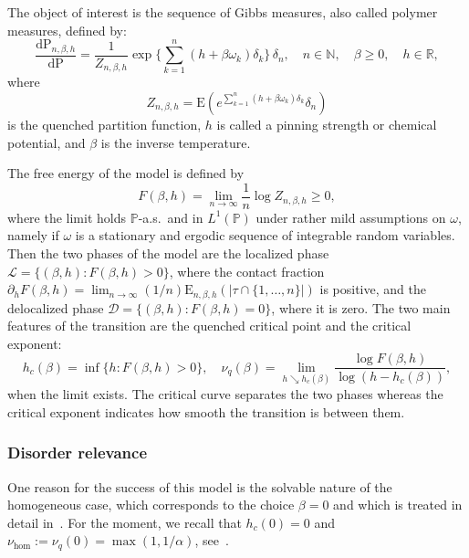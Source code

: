 \documentclass[11pt]{article}
\theoremstyle{definition}
\numberwithin{equation}{section}
\numberwithin{figure}{section}
\numberwithin{table}{section}
\newcommand{\bbN}{{\ensuremath{\mathbb N}}}
\newcommand{\bbP}{{\ensuremath{\mathbb P}}}
\newcommand{\bbR}{{\ensuremath{\mathbb R}}}
\newcommand{\cD}{{\ensuremath{\mathcal D}}}
\newcommand{\cL}{{\ensuremath{\mathcal L}}}
\newcommand{\ga}{\alpha}
\newcommand{\gb}{\beta}
\newcommand{\gd}{\delta}
\newcommand{\go}{\omega}
\newcommand{\dd}{\mathrm{d}}
\newcommand\bP{\ensuremath{\mathrm{P}}}
\newcommand\bE{\ensuremath{\mathrm{E}}}
\begin{document}
The object of interest is the sequence of Gibbs measures, also called polymer measures, defined by:
\begin{equation}\label{eq:defquemeas}
\frac{\dd \bP_{n,\gb,h}}{\dd \bP} = \frac{1}{Z_{n,\gb,h}} \exp \bigg\{\sum_{k=1}^n (h + \gb \go_k)\gd_k \bigg\} \,\gd_n, \quad n \in \bbN, \quad \gb \geq 0, \quad h \in \bbR,
\end{equation}
where
\begin{equation}\label{eq:defquepf}
Z_{n,\gb,h} = \bE \left(e^{\sum_{k=1}^n (h + \gb \go_k) \gd_k} \gd_n \right)
\end{equation}
is the quenched partition function, $h$ is called a pinning strength or chemical potential, and $\gb$ is the inverse temperature.

The free energy of the model is defined by
\begin{equation}
F(\gb,h) = \lim_{n \to \infty} \frac{1}{n} \log Z_{n,\gb,h} \geq 0,
\end{equation}
where the limit holds $\bbP$-a.s.~and in $L^1(\bbP)$ under rather mild assumptions on $\go$, namely if $\go$ is a stationary and ergodic sequence of integrable random variables. Then the two phases of the model are the localized phase $\cL = \{(\gb, h): F(\gb, h)>0\}$, where the contact fraction $\partial_h F(\gb,h) = \lim_{n \to \infty} (1/n) \bE_{n,\gb,h}(|\tau \cap \{1,\ldots,n\}|)$ is positive, and the delocalized phase $\cD = \{(\gb, h): F(\gb, h)=0\}$, where it is zero. The two main features of the transition are the quenched critical point and the critical exponent:
\begin{equation}
h_c(\gb) = \inf\{h \colon F(\gb,h) > 0\},\quad \nu_q(\gb) = \lim_{h \searrow h_c(\gb)} \frac{\log F(\gb,h)}{\log (h - h_c(\gb))},
\end{equation}
when the limit exists. The critical curve separates the two phases whereas the critical exponent indicates how smooth the transition is between them.

\subsubsection{Disorder relevance}

One reason for the success of this model is the solvable nature of the homogeneous case, which corresponds to the choice $\gb = 0$ and which is treated in detail in~\cite{Gi2007}. For the moment, we recall that $h_c(0) = 0$ and $\nu_{\hom}:= \nu_q(0) = \max(1,1/\ga)$, see~\cite[Theorem~2.1]{Gi2007}.
\end{document}

